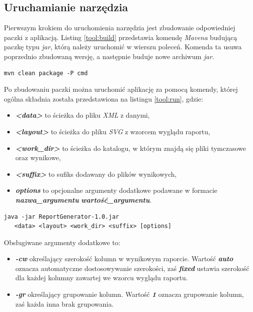 \documentclass[11pt,a4paper]{article}
\begin{document}
\subsection{Uruchamianie narzędzia}\label{tool:running}
Pierwszym krokiem do uruchomienia narzędzia jest zbudowanie odpowiedniej paczki z aplikacją. Listing \ref{tool:build} przedstawia komendę \emph{Mavena} budującą paczkę typu \emph{jar}, którą należy uruchomić w wierszu poleceń. Komenda ta usuwa poprzednio zbudowaną wersję, a następnie buduje nowe archiwum \emph{jar}.

\lstset{language=sh}
\begin{lstlisting}[frame=single,caption=Komenda \emph{Mavena} budująca paczkę \emph{jar} z aplikacją,label=tool:build]
mvn clean package -P cmd
\end{lstlisting}

Po zbudowaniu paczki można uruchomić aplikację za pomocą komendy, której ogólna składnia została przedstawiona na listingu \ref{tool:run}, gdzie:
\begin{itemize}
	\item \emph{\textbf{\textless data\textgreater}} to ścieżka do pliku \emph{XML} z danymi,
	\item \emph{\textbf{\textless layout\textgreater}} to ścieżka do pliku \emph{SVG} z wzorcem wyglądu raportu,
	\item \emph{\textbf{\textless work\_dir\textgreater}} to ścieżka do katalogu, w którym znajdą się pliki tymczasowe oraz wynikowe,
	\item \emph{\textbf{\textless suffix\textgreater}} to sufiks dodawany do plików wynikowych,
	\item \emph{\textbf{options}} to opcjonalne argumenty dodatkowe podawane w formacie\\ \emph{\textbf{nazwa\_argumentu}} \emph{\textbf{wartość\_argumentu}}.
\end{itemize}
\lstset{language=sh}
\begin{lstlisting}[frame=single,caption=Komenda uruchamiająca aplikację,label=tool:run]
java -jar ReportGenerator-1.0.jar
   <data> <layout> <work_dir> <suffix> [options]
\end{lstlisting}


Obsługiwane argumenty dodatkowe to:
\begin{itemize}
	\item \emph{\textbf{-cw}} określający szerokość kolumn w wynikowym raporcie. Wartość \emph{\textbf{auto}} oznacza automatyczne dostosowywanie szerokości, zaś \emph{\textbf{fixed}} ustawia szerokość dla każdej kolumny zawartej we wzorcu wyglądu raportu.
	\item \emph{\textbf{-gr}} określający grupowanie kolumn. Wartość \emph{\textbf{1}} oznacza grupowanie kolumn, zaś każda inna brak grupowania.
\end{itemize}
\end{document}
